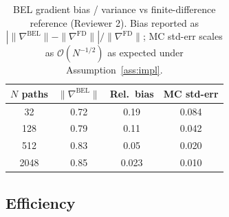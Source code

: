 \documentclass{ieeeaccess}
\begin{document}
\begin{table}[!t]
\caption{BEL gradient bias / variance vs finite-difference reference
(Reviewer 2). Bias reported as
$|\|\nabla^{\mathrm{BEL}}\|-\|\nabla^{\mathrm{FD}}\||/\|\nabla^{\mathrm{FD}}\|$;
MC std-err scales as $\mathcal O(N^{-1/2})$ as expected under
Assumption~\ref{ass:impl}.}
\label{tab:bel-diag}
\centering
\small
\begin{tabular}{@{}cccc@{}}
\toprule
$N$ paths & $\|\nabla^{\mathrm{BEL}}\|$ & Rel.\ bias & MC std-err\\
\midrule
32   & 0.72 & 0.19 & 0.084 \\
128  & 0.79 & 0.11 & 0.042 \\
512  & 0.83 & 0.05 & 0.020 \\
2048 & 0.85 & 0.023 & 0.010 \\
\bottomrule
\end{tabular}
\end{table}

\subsection{Efficiency}\label{subsec:efficiency}
\begin{table}[!t]
\caption{Efficiency, calibration, and reliability summary.
Latency on NVIDIA A100 80GB, batch size 128.}
\label{tab:efficiency}
\centering
\small
{}
\end{table}

\end{document}
